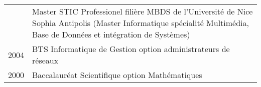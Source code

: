 %
%
%

\begin{tabular}{>{\small}r>{\small}p{14cm}}
 \parbox{\datebox}{} & Master STIC Professionel filière MBDS
 de l'Université de Nice Sophia Antipolis (Master Informatique spécialité Multimédia, Base de Données et
 intégration de Systèmes) \\ 
 2004 & BTS Informatique de Gestion option administrateurs de réseaux \\
 2000 & Baccalauréat Scientifique option Mathématiques
\end{tabular}